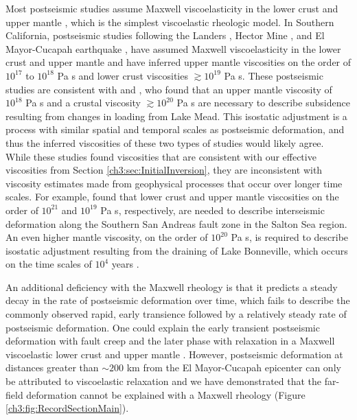 Most postseismic studies assume Maxwell viscoelasticity in the lower crust and upper mantle \citep[e.g.][]{Nur1974,Pollitz2000,Hetland2003,Freed2006a,Johnson2009,Hearn2009}, which is the simplest viscoelastic rheologic model.  In Southern California, postseismic studies following the Landers \citep{Pollitz2000}, Hector Mine \citep{Pollitz2001}, and El Mayor-Cucapah earthquake \citep{Spinler2015,Rollins2015}, have assumed Maxwell viscoelasticity in the lower crust and upper mantle and have inferred upper mantle viscosities on the order of $10^{17}$ to $10^{18}$ Pa s and lower crust viscosities $\gtrsim 10^{19}$ Pa s.  These postseismic studies are consistent with \citet{Kaufmann2000} and \citet{Cavalie2007}, who found that an upper mantle viscosity of $10^{18}$ Pa s and a crustal viscosity $\gtrsim10^{20}$ Pa s are necessary to describe subsidence resulting from changes in loading from Lake Mead. This isostatic adjustment is a process with similar spatial and temporal scales as postseismic deformation, and thus the inferred viscosities of these two types of studies would likely agree. While these studies found viscosities that are consistent with our effective viscosities from Section \ref{ch3:sec:InitialInversion}, they are inconsistent with viscosity estimates made from geophysical processes that occur over longer time scales. For example, \citet{Lundgren2009} found that lower crust and upper mantle viscosities on the order of $10^{21}$ and $10^{19}$ Pa s, respectively, are needed to describe interseismic deformation along the Southern San Andreas fault zone in the Salton Sea region.  An even higher mantle viscosity, on the order of $10^{20}$ Pa s, is required to describe isostatic adjustment resulting from the draining of Lake Bonneville, which occurs on the time scales of $10^{4}$ years \citep{Crittenden1967,Bills1987}.  

An additional deficiency with the Maxwell rheology is that it predicts a steady decay in the rate of postseismic deformation over time, which fails to describe the commonly observed rapid, early transience followed by a relatively steady rate of postseismic deformation.  One could explain the early transient postseismic deformation with fault creep and the later phase with relaxation in a Maxwell viscoelastic lower crust and upper mantle \citep[e.g][]{Hearn2009,Johnson2009}. However, postseismic deformation at distances greater than ${\sim}200$ km from the El Mayor-Cucapah epicenter can only be attributed to viscoelastic relaxation \citep[e.g.][]{Freed2007a} and we have demonstrated that the far-field deformation cannot be explained with a Maxwell rheology (Figure \ref{ch3:fig:RecordSectionMain}).

